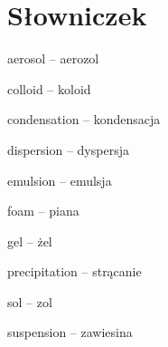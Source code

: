 
{\color{red}
\section{Słowniczek}
\begin{compactitem}
	\item aerosol -- aerozol
	\item colloid -- koloid
	\item condensation -- kondensacja
	\item dispersion -- dyspersja
	\item emulsion -- emulsja
	\item foam -- piana
	\item gel -- żel
	\item precipitation -- strącanie
	\item sol -- zol
	\item suspension -- zawiesina
\end{compactitem}
}